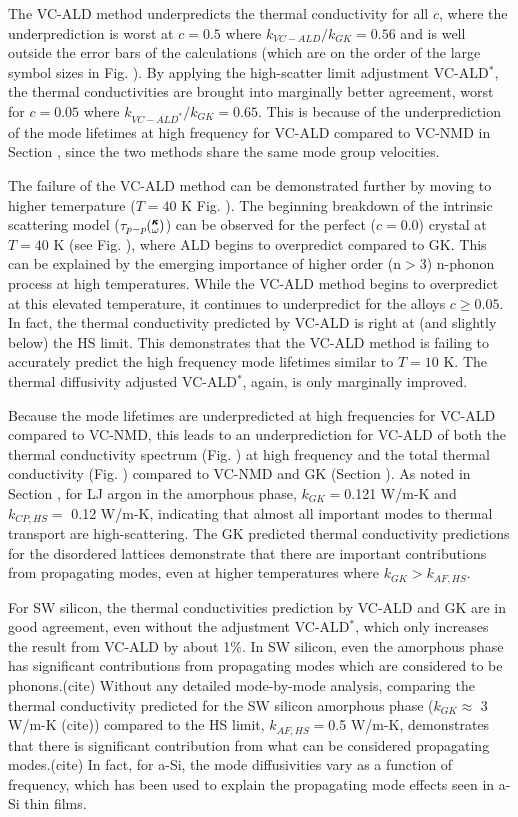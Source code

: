 \documentclass[aps,prb,onecolumn,preprint,superscriptaddress,amsmath,amssymb,floatfix]{revtex4}
\newcommand{\kw}{\mspace{-4.0mu}\left(\mspace{-8.0mu}
\begin{smallmatrix}&\pmb{\kappa} \\&\omega\end{smallmatrix}
\mspace{-3.0mu}\right)}
\begin{document}
The VC-ALD method underpredicts the thermal conductivity for all $c$, where 
the underprediction is worst at $c=0.5$ where $k_{VC-ALD} / k_{GK} = 0.56$ 
and is well outside the error bars of the calculations (which are on the order 
of the large symbol sizes in Fig. ). By applying the high-scatter limit 
adjustment VC-ALD$^*$, the thermal conductivities are brought into marginally 
better agreement, worst for $c=0.05$ where $k_{VC-ALD^*} / k_{GK} = 0.65$. 
This is because of the underprediction of the mode lifetimes at high frequency 
for VC-ALD compared to VC-NMD in Section , since the two methods share the 
same mode group velocities. 

The failure of the VC-ALD method can be demonstrated further 
by moving to higher temerpature ($T=40$ K Fig. ).
The beginning breakdown of the intrinsic scattering model 
($\tau_{p-p}\kw$) can be observed for the perfect ($c=0.0$) crystal at 
$T=40$ K (see Fig. ), where ALD begins to overpredict compared to GK.  This 
can be explained by the emerging importance of higher order (n$> 3$) 
n-phonon process at high temperatures.\cite{turney_predicting_2009} 
While the VC-ALD method begins to overpredict at this elevated temperature, 
it continues to underpredict for the alloys $c \ge 0.05$.  In fact, the 
thermal conductivity predicted by VC-ALD is right at (and slightly below) 
the HS limit. This demonstrates that the VC-ALD method is failing to 
accurately predict the high frequency mode lifetimes similar 
to $T=10$ K. The thermal diffusivity adjusted VC-ALD$^*$, again, is 
only marginally improved. 

Because the mode lifetimes are underpredicted at high frequencies for 
VC-ALD compared to VC-NMD, this leads to an underprediction for VC-ALD 
of both the thermal conductivity spectrum (Fig. ) at high 
frequency and the total thermal conductivity (Fig. ) 
compared to VC-NMD and GK (Section ). 
As noted in Section , for LJ argon in the amorphous phase, 
$k_{GK} = $0.121 W/m-K and $k_{CP,HS} =$ 0.12 W/m-K, indicating that 
almost all important modes to thermal transport are high-scattering. The GK 
predicted thermal conductivity predictions for the disordered lattices 
demonstrate that there are 
important contributions from propagating modes, even at higher temperatures 
where $k_{GK} > k_{AF,HS}$. 

For SW silicon, the thermal conductivities prediction by VC-ALD and GK 
are in good agreement, even without the adjustment VC-ALD$^*$, which only 
increases the result from VC-ALD by about 1$\%$. 
In SW silicon, even the amorphous phase has significant contributions 
from propagating modes which are considered to be phonons.(cite) Without 
any detailed mode-by-mode analysis, comparing the thermal 
conductivity predicted for the 
SW silicon amorphous phase ($k_{GK} \approx$ 3 W/m-K (cite)) compared to 
the HS limit, 
$k_{AF,HS} = $0.5 W/m-K, demonstrates that there is significant 
contribution from what can be considered propagating modes.(cite)  
In fact, for a-Si, the mode diffusivities vary as a function 
of frequency,
\cite{feldman_thermal_1993,feldman_numerical_1999,allen_diffusons_1999} 
which has been used to explain the propagating 
mode effects seen in a-Si thin films.\cite{he_heat_2011}
\end{document}
